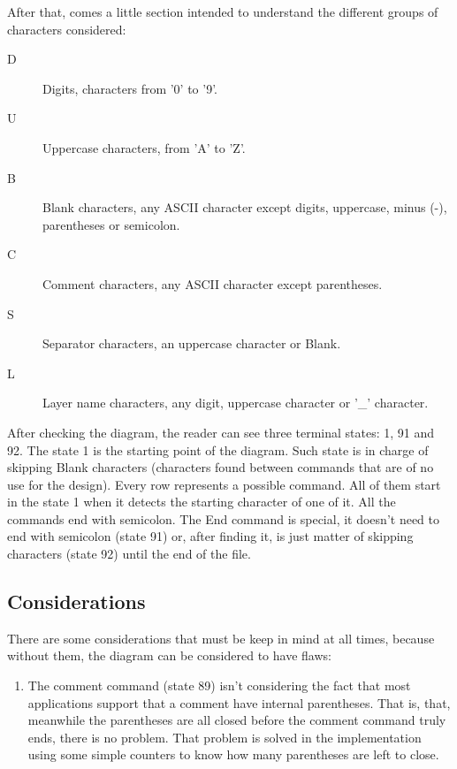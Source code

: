 \documentclass[11pt,twoside,openany,x11names,svgnames]{memoir}
\begin{document}
After that, comes a little section intended to understand the different groups of characters considered:

\begin{description}
\item[D]	Digits, characters from '0' to '9'.
\item[U]	Uppercase characters, from 'A' to 'Z'.
\item[B]	Blank characters, any ASCII character except digits, uppercase, minus (-), parentheses or semicolon.
\item[C]	Comment characters, any ASCII character except parentheses.
\item[S]	Separator characters, an uppercase character or Blank.
\item[L]	Layer name characters, any digit, uppercase character or '_' character.
\end{description}

After checking the diagram, the reader can see three terminal states: 1, 91 and 92. The state 1 is the starting point of the diagram. Such state is in charge of skipping Blank characters (characters found between commands that are of no use for the design). Every row represents a possible command. All of them start in the state 1 when it detects the starting character of one of it. All the commands end with semicolon. The End command is special, it doesn't need to end with semicolon (state 91) or, after finding it, is just matter of skipping characters (state 92) until the end of the file.

\subsection{Considerations}\label{Considerations}

There are some considerations that must be keep in mind at all times, because without them, the diagram can be considered to have flaws:

\begin{enumerate}
\item The comment command (state 89) isn't considering the fact that most applications support that a comment have internal parentheses. That is, that, meanwhile the parentheses are all closed before the comment command truly ends, there is no problem. That problem is solved in the implementation using some simple counters to know how many parentheses are left to close.
\end{enumerate}
\end{document}
